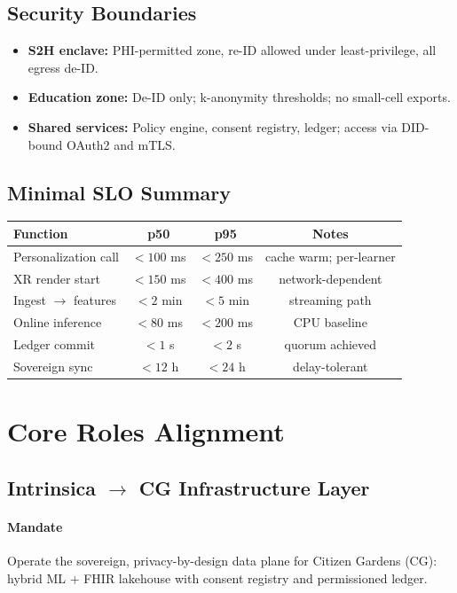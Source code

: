 \documentclass[11pt]{article}
\theoremstyle{plain}
\begin{document}
\subsection{Security Boundaries}
\begin{itemize}
  \item \textbf{S2H enclave:} PHI-permitted zone, re-ID allowed under least-privilege, all egress de-ID.
  \item \textbf{Education zone:} De-ID only; k-anonymity thresholds; no small-cell exports.
  \item \textbf{Shared services:} Policy engine, consent registry, ledger; access via DID-bound OAuth2 and mTLS.
\end{itemize}

\subsection{Minimal SLO Summary}
\begin{center}
\begin{tabular}{lccc}
\toprule
\textbf{Function} & \textbf{p50} & \textbf{p95} & \textbf{Notes} \\
\midrule
Personalization call & $<100$ ms & $<250$ ms & cache warm; per-learner \\
XR render start & $<150$ ms & $<400$ ms & network-dependent \\
Ingest $\rightarrow$ features & $<2$ min & $<5$ min & streaming path \\
Online inference & $<80$ ms & $<200$ ms & CPU baseline \\
Ledger commit & $<1$ s & $<2$ s & quorum achieved \\
Sovereign sync & $<12$ h & $<24$ h & delay-tolerant \\
\bottomrule
\end{tabular}
\end{center}

\section{Core Roles Alignment}

\subsection*{Intrinsica $\rightarrow$ CG Infrastructure Layer}
\paragraph{Mandate}
Operate the sovereign, privacy-by-design data plane for Citizen Gardens (CG): hybrid ML + FHIR lakehouse with consent registry and permissioned ledger.
\end{document}
